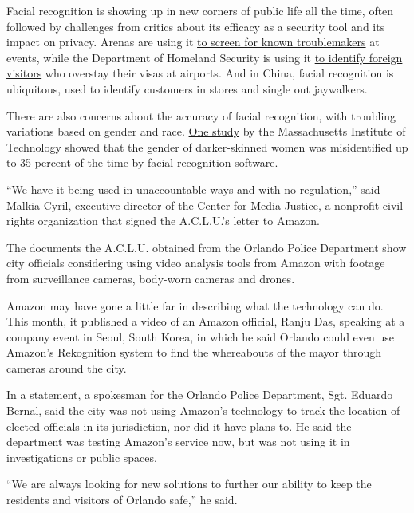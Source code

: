 Facial recognition is showing up in new corners of public life all the
time, often followed by challenges from critics about its efficacy as a
security tool and its impact on privacy. Arenas are using it
\href{https://www.nytimes3xbfgragh.onion/2018/03/13/sports/facial-recognition-madison-square-garden.html}{to
screen for known troublemakers} at events, while the Department of
Homeland Security is using it
\href{https://www.nytimes3xbfgragh.onion/2017/12/21/us/politics/facial-scans-airports-security-privacy.html}{to
identify foreign visitors} who overstay their visas at airports. And in
China, facial recognition is ubiquitous, used to identify customers in
stores and single out jaywalkers.

There are also concerns about the accuracy of facial recognition, with
troubling variations based on gender and race.
\href{https://www.nytimes3xbfgragh.onion/2018/02/09/technology/facial-recognition-race-artificial-intelligence.html}{One
study} by the Massachusetts Institute of Technology showed that the
gender of darker-skinned women was misidentified up to 35 percent of the
time by facial recognition software.

``We have it being used in unaccountable ways and with no regulation,''
said Malkia Cyril, executive director of the Center for Media Justice, a
nonprofit civil rights organization that signed the A.C.L.U.'s letter to
Amazon.

The documents the A.C.L.U. obtained from the Orlando Police Department
show city officials considering using video analysis tools from Amazon
with footage from surveillance cameras, body-worn cameras and drones.

Amazon may have gone a little far in describing what the technology can
do. This month, it published a video of an Amazon official, Ranju Das,
speaking at a company event in Seoul, South Korea, in which he said
Orlando could even use Amazon's Rekognition system to find the
whereabouts of the mayor through cameras around the city.

In a statement, a spokesman for the Orlando Police Department, Sgt.
Eduardo Bernal, said the city was not using Amazon's technology to track
the location of elected officials in its jurisdiction, nor did it have
plans to. He said the department was testing Amazon's service now, but
was not using it in investigations or public spaces.

``We are always looking for new solutions to further our ability to keep
the residents and visitors of Orlando safe,'' he said.

